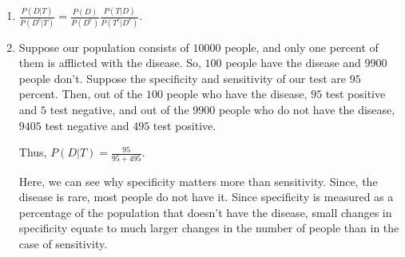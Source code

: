 \begin{enumerate}[label=(\alph*)]

\item $\frac{P(D|T)}{P(D^{c}|T)} = \frac{P(D)}{P(D^{c})} \frac{P(T|D)}{P(T^
{c}|D^{c})}.$

\item Suppose our population consists of $10000$ people, and only one percent of
them is afflicted with the disease. So, $100$ people have the disease and 
$9900$ people don't. Suppose the specificity and sensitivity of our test are
$95$ percent. Then, out of the $100$ people who have the disease, $95$ test 
positive and $5$ test negative, and out of the $9900$ people who do not have
the disease, $9405$ test negative and $495$ test positive.

Thus, $P(D|T) = \frac{95}{95 + 495}.$

Here, we can see why specificity matters more than sensitivity. Since, the
disease is rare, most people do not have it. Since specificity is measured as a
percentage of the population that doesn't have the disease, small changes
in specificity equate to much larger changes in the number of people than in
the case of sensitivity.

\end{enumerate}